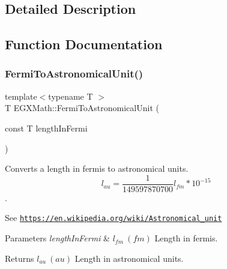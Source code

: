 \subsection{Detailed Description}


\subsection{Function Documentation}
\mbox{\label{group___e_g_x_math-_conversions-_length_conversions-_non-_s_i-_fermi-_astronomical_ga15004dd6eba6bf24f731945b4d78efcd}} 
\subsubsection{\texorpdfstring{Fermi\+To\+Astronomical\+Unit()}{FermiToAstronomicalUnit()}}
{\footnotesize\ttfamily template$<$typename T $>$ \\
T E\+G\+X\+Math\+::\+Fermi\+To\+Astronomical\+Unit (\begin{DoxyParamCaption}\item[{const T}]{length\+In\+Fermi }\end{DoxyParamCaption})}



Converts a length in fermis to astronomical units. \[ l_{au}= \frac{1}{149597870700} l_{fm} * 10^{-15} \]. 

See \href{https://en.wikipedia.org/wiki/Astronomical_unit}{\tt https\+://en.\+wikipedia.\+org/wiki/\+Astronomical\+\_\+unit} 
\begin{DoxyParams}{Parameters}
{\em length\+In\+Fermi} & $ l_{fm}\ (fm)$ Length in fermis. \\
\hline
\end{DoxyParams}
\begin{DoxyReturn}{Returns}
$ l_{au}\ (au)$ Length in astronomical units. 
\end{DoxyReturn}
\mbox{\label{group___e_g_x_math-_conversions-_length_conversions-_non-_s_i-_fermi-_astronomical_ga970405631cdcf18ba0c2bd9b3ec37dec}} 

